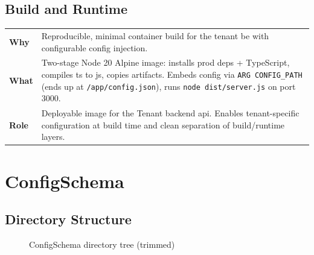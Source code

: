 \documentclass[11pt, a4paper, oneside, listof=totoc]{scrartcl}
\makeatletter
\newcommand{\codesummary}[3]{%
    \vspace{0.4\baselineskip}%
    \noindent\begin{tabularx}{\linewidth}{@{}>{\bfseries}l X@{}}
    Why  & #1\\
    What & #2\\
    Role & #3\\
    \end{tabularx}%
    \vspace{0.2\baselineskip}%
}
\makeatother
\begin{document}
            \subsection{Build and Runtime}
                \codesummary
                    {Reproducible, minimal container build for the tenant \gls{be} with configurable config injection.}
                    {Two-stage Node 20 Alpine image: installs prod deps + TypeScript, compiles \gls{ts} to \gls{js}, copies artifacts. Embeds config via \texttt{ARG CONFIG\_PATH} (ends up at \texttt{/app/config.json}), runs \texttt{node dist/server.js} on port 3000.}
                    {Deployable image for the Tenant backend \gls{api}. Enables tenant-specific configuration at build time and clean separation of build/runtime layers.}

        \clearpage

        \section{ConfigSchema}\label{app:configschema}

            \subsection{Directory Structure}
                \begin{figure}[H]
                    \centering
                    \caption{ConfigSchema directory tree (trimmed)}\label{fig:configschema-tree}
                \end{figure}

        \clearpage
\end{document}

